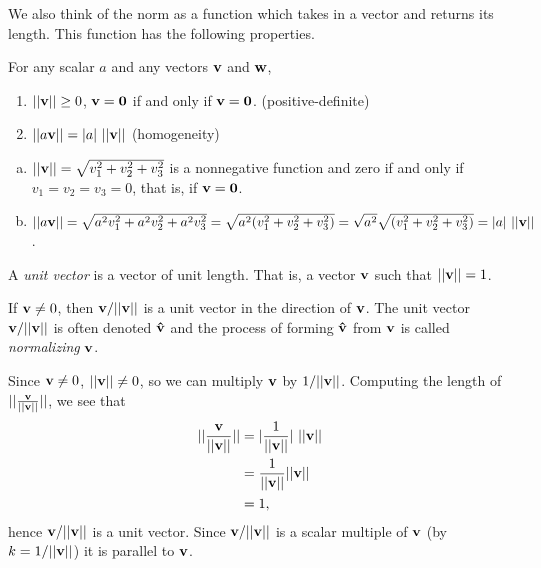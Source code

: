 \documentclass[12pt,letterpaper,reqno]{article}
\numberwithin{equation}{section}
\newcommand{\ti}[1]{\textit{#1}}
\begin{document}
We also think of the norm as a function which takes in a vector and returns its length. This function has the following properties.

\begin{prop}
	For any scalar $a$ and any vectors ${\bf v}$ and ${\bf w}$,
	\begin{enumerate}[(1)]
		\item $||{\bf v}|| \geq 0$, ${\bf v}={\bf 0}$ if and only if ${\bf v}={\bf 0}$. (positive-definite)
		\item $||a{\bf v}||=|a| \ ||{\bf v}||$ (homogeneity)
	\end{enumerate}
\end{prop}

\begin{pf}
\begin{enumerate}[(a)]
	\item $||{\bf v}||=\sqrt{v_1^2+v_2^2+v_3^2}$ is a nonnegative function and zero if and only if $v_1=v_2=v_3=0$, that is, if ${\bf v}={\bf 0}$.
	\item $||a{\bf v}||=\sqrt{a^2v_1^2+a^2v_2^2+a^2v_3^2}=\sqrt{a^2(v_1^2+v_2^2+v_3^2)}=\sqrt{a^2}\sqrt{(v_1^2+v_2^2+v_3^2)}=|a|\ ||{\bf v}||$.
\end{enumerate}
\end{pf}


\begin{defn}
	A \ti{unit vector} is a vector of unit length. That is, a vector ${\bf v}$ such that $||{\bf v}||=1$.
\end{defn}

\begin{prop}
	If ${\bf v}\neq 0$, then ${\bf v}/||{\bf v}||$ is a unit vector in the direction of ${\bf v}$. The unit vector ${\bf v}/||{\bf v}||$ is often denoted ${\bf \hat{v}}$ and the process of forming ${\bf \hat{v}}$ from ${\bf v}$ is called \ti{normalizing} ${\bf v}$.
\end{prop}

\begin{pf}
Since ${\bf v}\neq 0$, $||{\bf v}|| \neq 0$, so we can multiply ${\bf v}$ by $1/||{\bf v}||$. Computing the length of $||\frac{{\bf v}}{||{\bf v}||}||$, we see that 
\begin{align*}
	||\frac{{\bf v}}{||{\bf v}||}||&=\vert \frac{1}{||{\bf v}||} \vert \ ||{\bf v}|| \\
	&=\frac{1}{||{\bf v}||}  ||{\bf v}|| \\
	&=1,
\end{align*} 
hence ${\bf v}/||{\bf v}||$ is a unit vector. Since ${\bf v}/||{\bf v}||$ is a scalar multiple of ${\bf v}$ (by $k=1/||{\bf v}||$) it is parallel to ${\bf v}$.
\end{pf}
\end{document}
